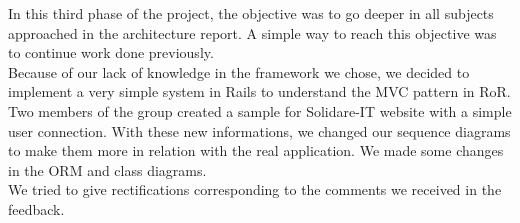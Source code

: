

In this third phase of the project, the objective was to go deeper in all subjects approached in the architecture report. A simple way to reach this objective was to continue work done previously. \\

Because of our lack of knowledge in the framework we chose, we decided to implement a very simple system in Rails to understand the MVC pattern in RoR. Two members of the group created a sample for Solidare-IT website with a simple user connection. With these new informations, we changed our sequence diagrams to make them more in relation with the real application. We made some changes in the ORM and class diagrams. \\
We tried to give rectifications corresponding to the comments we received in the feedback. \\

